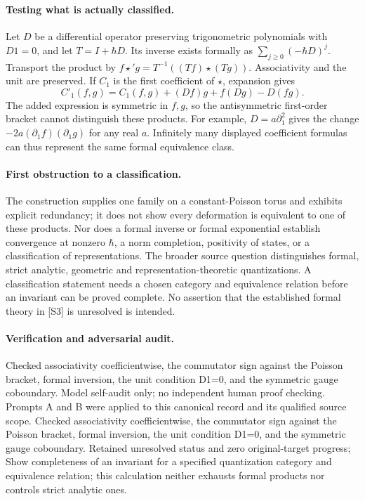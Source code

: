 \documentclass[11pt]{article}
\begin{document}
\paragraph{Testing what is actually classified.}
Let $D$ be a differential operator preserving trigonometric polynomials with $D1=0$, and let $T=I+\hbar D$. Its inverse exists formally as $\sum_{j\geq0}(-\hbar D)^j$. Transport the product by
$f\star' g=T^{-1}((Tf)\star(Tg))$.
Associativity and the unit are preserved. If $C_1$ is the first coefficient of $\star$, expansion gives
\[
 C'_1(f,g)=C_1(f,g)+(Df)g+f(Dg)-D(fg).
\]
The added expression is symmetric in $f,g$, so the antisymmetric first-order bracket cannot distinguish these products. For example, $D=a\partial_1^2$ gives the change $-2a(\partial_1f)(\partial_1g)$ for any real $a$. Infinitely many displayed coefficient formulas can thus represent the same formal equivalence class.

\paragraph{First obstruction to a classification.}
The construction supplies one family on a constant-Poisson torus and exhibits explicit redundancy; it does not show every deformation is equivalent to one of these products. Nor does a formal inverse or formal exponential establish convergence at nonzero $\hbar$, a norm completion, positivity of states, or a classification of representations. The broader source question distinguishes formal, strict analytic, geometric and representation-theoretic quantizations. A classification statement needs a chosen category and equivalence relation before an invariant can be proved complete. No assertion that the established formal theory in [S3] is unresolved is intended.

\paragraph{Verification and adversarial audit.}
Checked associativity coefficientwise, the commutator sign against the Poisson bracket, formal inversion, the unit condition D1=0, and the symmetric gauge coboundary. Model self-audit only; no independent human proof checking. Prompts A and B were applied to this canonical record and its qualified source scope. Checked associativity coefficientwise, the commutator sign against the Poisson bracket, formal inversion, the unit condition D1=0, and the symmetric gauge coboundary. Retained unresolved status and zero original-target progress; Show completeness of an invariant for a specified quantization category and equivalence relation; this calculation neither exhausts formal products nor controls strict analytic ones.
\end{document}
